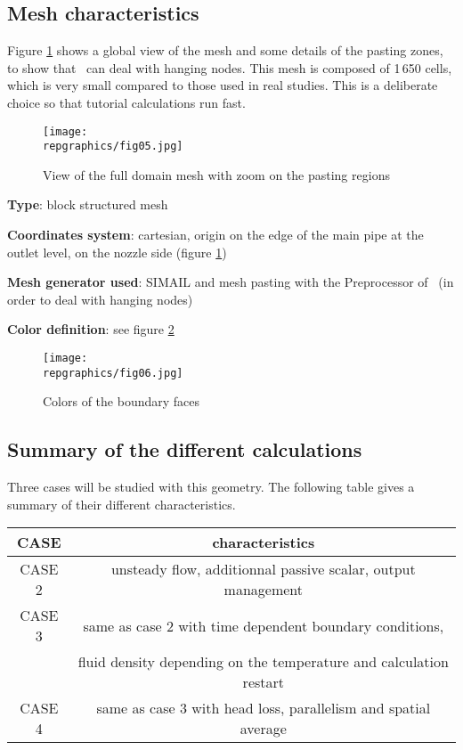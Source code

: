 	\subsection{Mesh characteristics}

Figure \ref{figante22} shows a global view of the mesh and some details of
the pasting zones, to show that \CS\ can deal with hanging nodes.
This mesh is composed of 1\,650 cells, which is very small compared to those used in real
studies. This is a deliberate choice so that tutorial calculations run fast.
	
\begin{figure}[h!]
\begin{center}
\texttt{[image: \\repgraphics/fig05.jpg]} 
\caption{View of the full domain mesh with zoom on the pasting regions}
\label{figante22}
\end{center}
\end{figure}

{\bfseries Type}: block structured mesh

{\bfseries Coordinates system}: cartesian, origin on the edge of the main
pipe at the outlet level, on the nozzle side (figure \ref{figante22})

{\bfseries Mesh generator used}: SIMAIL and mesh pasting with the Preprocessor
of \CS\ (in order to deal with hanging nodes)

{\bfseries Color definition}: see figure \ref{figante23} 

\begin{figure}[h!]
\begin{center}
\texttt{[image: \\repgraphics/fig06.jpg]} 
\caption{Colors of the boundary faces}
\label{figante23}
\end{center}
\end{figure}


	\subsection{Summary of the different calculations}

Three cases will be studied with this geometry. The following table gives a
summary of their different characteristics.
\begin{center}
\begin{tabular}{|c|c|}
\hline
CASE & characteristics \\
\hline
CASE 2 & unsteady flow, additionnal passive scalar, output management \\
\hline
CASE 3 & same as case 2 with time dependent boundary conditions, \\ 
 &       fluid density depending on the temperature and calculation restart\\
\hline
CASE 4 & same as case 3 with head loss, parallelism and spatial average \\
\hline
\end{tabular}
\end{center}


